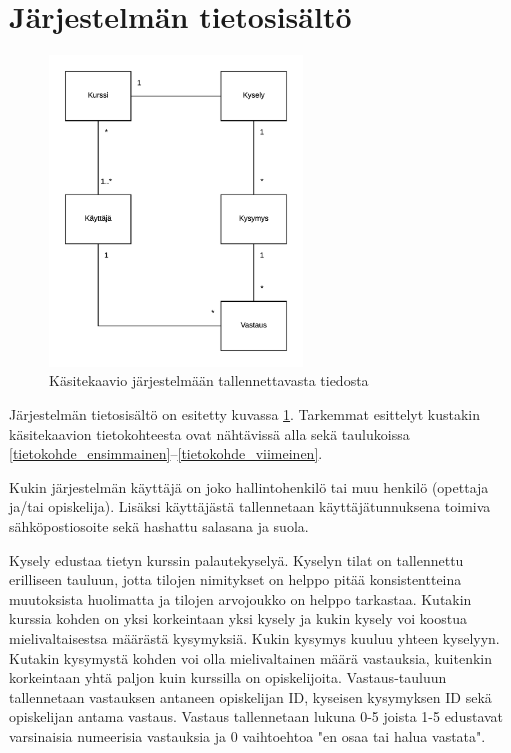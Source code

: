 \documentclass[12pt,a4paper,titlepage]{article}
\begin{document}
\section{Järjestelmän tietosisältö}
\begin{figure}
   \centering
   \includegraphics[width=0.6\textwidth]{kuvat/kasitekaavio.png}
   \caption{Käsitekaavio järjestelmään tallennettavasta tiedosta}\label{fig:kasitekaavio}
\end{figure}

Järjestelmän tietosisältö on esitetty kuvassa \ref{fig:kasitekaavio}. Tarkemmat esittelyt kustakin käsitekaavion tietokohteesta ovat nähtävissä alla sekä taulukoissa \ref{tietokohde_ensimmainen}--\ref{tietokohde_viimeinen}.

Kukin järjestelmän käyttäjä on joko hallintohenkilö tai muu henkilö (opettaja ja/tai opiskelija). Lisäksi käyttäjästä tallennetaan käyttäjätunnuksena toimiva sähköpostiosoite sekä hashattu salasana ja suola.

Kysely edustaa tietyn kurssin palautekyselyä. Kyselyn tilat on tallennettu erilliseen tauluun, jotta tilojen nimitykset on helppo pitää konsistentteina muutoksista huolimatta ja tilojen arvojoukko on helppo tarkastaa. Kutakin kurssia kohden on yksi korkeintaan yksi kysely ja kukin kysely voi koostua mielivaltaisestsa määrästä kysymyksiä. Kukin kysymys kuuluu yhteen kyselyyn. Kutakin kysymystä kohden voi olla mielivaltainen määrä vastauksia, kuitenkin korkeintaan yhtä paljon kuin kurssilla on opiskelijoita. Vastaus-tauluun tallennetaan vastauksen antaneen opiskelijan ID, kyseisen kysymyksen ID sekä opiskelijan antama vastaus. Vastaus tallennetaan lukuna 0-5 joista 1-5 edustavat varsinaisia numeerisia vastauksia ja 0 vaihtoehtoa "en osaa tai halua vastata".
\end{document}

